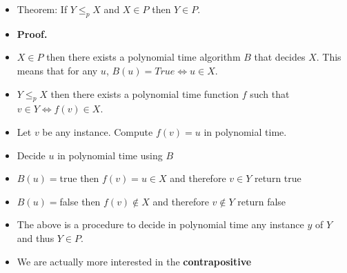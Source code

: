 \documentclass{beamer}
\begin{document}
\begin{frame}
  \begin{itemize}
  \item Theorem: If $Y\le_p X$ and $X\in P$ then $Y\in P$. 
\item \textbf{Proof.}
\item $X\in P$ then there exists a polynomial time algorithm  $B$ that decides $X$. This means 
that for any $u$, $B(u)=True \Leftrightarrow u\in X$.
\item $Y\le_p X$ then there exists a polynomial time function $f$ such that $v\in Y\Leftrightarrow f(v)\in X$.
\item Let $v$ be any instance. Compute $f(v)=u$ in polynomial time.
\item Decide $u$ in polynomial time using $B$
\item $B(u)=$true then $f(v)=u\in X$ and therefore $v\in Y$ return true
\item $B(u)=$false then $f(v)\notin X$ and therefore $v\notin Y$ return false
\item The above is a procedure to decide in polynomial time any instance $y$ of $Y$ and thus $Y\in P$.
\item We are actually more interested in the \textbf{contrapositive}
  \end{itemize}
\end{frame}
\end{document}

